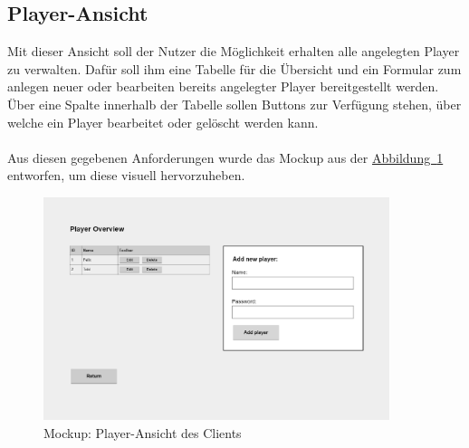 \subsection{Player-Ansicht}\label{sec:playerView}
Mit dieser Ansicht soll der Nutzer die Möglichkeit erhalten alle angelegten Player zu verwalten. Dafür soll ihm eine Tabelle für die Übersicht und ein Formular zum anlegen neuer oder bearbeiten bereits angelegter Player bereitgestellt werden. Über eine Spalte innerhalb der Tabelle sollen Buttons zur Verfügung stehen, über welche ein Player bearbeitet oder gelöscht werden kann.\\
\\
Aus diesen gegebenen Anforderungen wurde das Mockup aus der \hyperref[fig:playerView]{Abbildung~\ref{fig:playerView}} entworfen, um diese visuell hervorzuheben.
\begin{figure}[htb]
	\includegraphics[width=0.9\textwidth]{images/player-view.png}
	\caption{Mockup: Player-Ansicht des Clients}
	\label{fig:playerView}
\end{figure}

